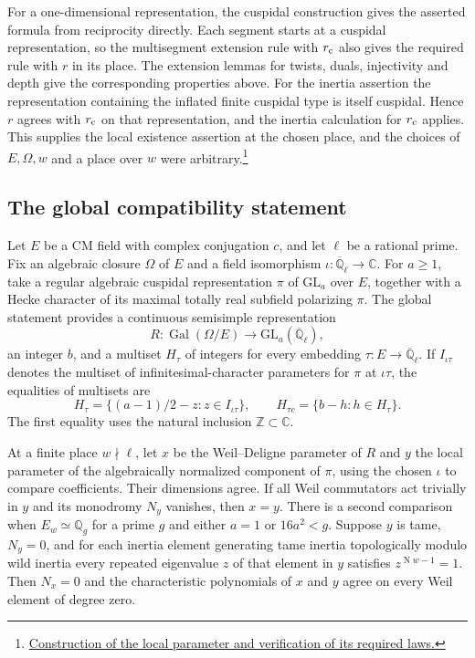 For a one-dimensional representation, the cuspidal construction gives
the asserted formula from reciprocity directly. Each segment starts at
a cuspidal representation, so the multisegment extension rule with
\(r_{\rm c}\) also gives the required rule with \(r\) in its place.
The extension lemmas for twists, duals, injectivity and depth give
the corresponding properties above. For the inertia assertion the
representation containing the inflated finite cuspidal type is itself
cuspidal. Hence \(r\) agrees with \(r_{\rm c}\) on that representation,
and the inertia calculation for \(r_{\rm c}\) applies. This supplies
the local existence assertion at the chosen place, and the choices of
\(E,\Omega,w\) and a place over \(w\) were arbitrary.\footnote{\href{https://github.com/Deicyde/riemann-hypothesis/blob/40e56bab/src/Development/AutomorphicArithmetic/Foundations/LocalLanglands/LocalCentralUnits/RecTExists.lean\#L20-L66}{Construction of the local parameter and verification of its required laws.}}

\subsection{The global compatibility statement}

Let \(E\) be a CM field with complex conjugation \(c\), and let \(\ell\)
be a rational prime. Fix an algebraic closure \(\Omega\) of \(E\) and
a field isomorphism \(\iota:\overline{\mathbb Q}_{\ell}\to\mathbb C\).
For \(a\ge1\), take a regular algebraic cuspidal representation \(\pi\)
of \(\mathrm{GL}_a\) over \(E\), together with a Hecke character of
its maximal totally real subfield polarizing \(\pi\). The global
statement provides a continuous semisimple representation
\[
  R:\operatorname{Gal}(\Omega/E)\longrightarrow
       \mathrm{GL}_a(\overline{\mathbb Q}_\ell),
\]
an integer \(b\), and a multiset \(H_\tau\) of integers for every
embedding \(\tau:E\to\overline{\mathbb Q}_{\ell}\). If \(I_{\iota\tau}\)
denotes the multiset of infinitesimal-character parameters for \(\pi\)
at \(\iota\tau\), the equalities of multisets are
\[
  H_\tau=\{(a-1)/2-z:z\in I_{\iota\tau}\},
  \qquad H_{\tau c}=\{b-h:h\in H_\tau\}.
\]
The first equality uses the natural inclusion \(\mathbb Z\subset\mathbb C\).

At a finite place \(w\nmid\ell\), let \(x\) be the Weil--Deligne
parameter of \(R\) and \(y\) the local parameter of the algebraically
normalized component of \(\pi\), using the chosen \(\iota\) to compare
coefficients. Their dimensions agree. If all Weil commutators act
trivially in \(y\) and its monodromy \(N_y\) vanishes, then \(x=y\).
There is a second comparison when \(E_w\simeq\mathbb Q_g\) for a
prime \(g\) and either \(a=1\) or \(16a^2<g\). Suppose \(y\) is tame,
\(N_y=0\), and for each inertia element generating tame inertia
topologically modulo wild inertia every repeated eigenvalue \(z\) of
that element in \(y\) satisfies \(z^{\operatorname{N}w-1}=1\). Then
\(N_x=0\) and the characteristic polynomials of \(x\) and \(y\)
agree on every Weil element of degree zero.

